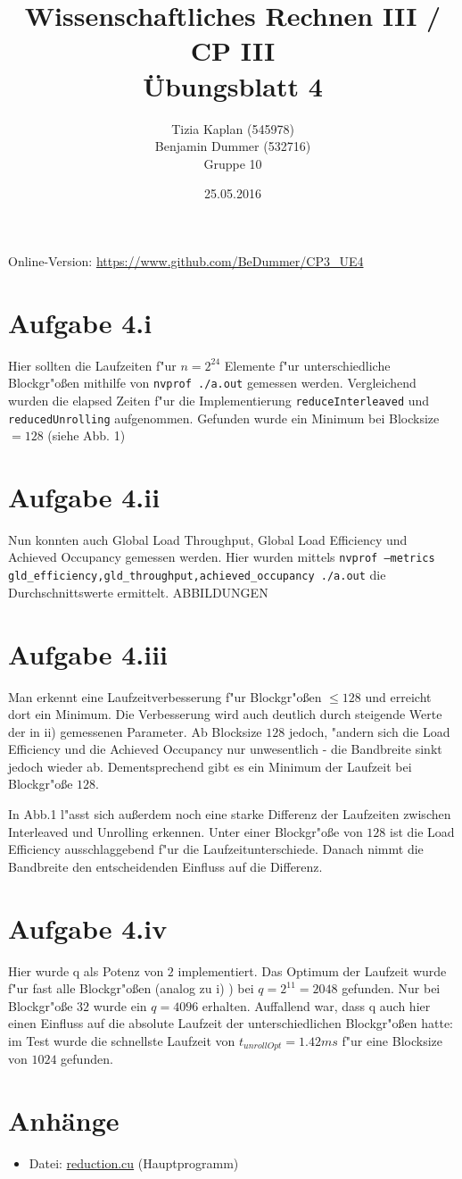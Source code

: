 \documentclass[%
	paper=A4,	%
	pagesize,	%
	DIV=calc,	%
	smallheadings,	%
	ngerman		%
]{scrartcl}
\title{{\bf Wissenschaftliches Rechnen III / CP III}\\Übungsblatt 4}
\author{Tizia Kaplan (545978)\\Benjamin Dummer (532716)\\ Gruppe 10}
\date{25.05.2016}
\begin{document}
\maketitle
Online-Version: \href{https://www.github.com/BeDummer/CP3_UE4}{\url{https://www.github.com/BeDummer/CP3_UE4}}

\section*{Aufgabe 4.i}
Hier sollten die Laufzeiten f"ur $n=2^24$ Elemente f"ur unterschiedliche Blockgr"o\ss en mithilfe von \texttt{nvprof ./a.out} gemessen werden. Vergleichend wurden die elapsed Zeiten f"ur die Implementierung \texttt{reduceInterleaved} und \texttt{reducedUnrolling} aufgenommen. Gefunden wurde ein Minimum bei Blocksize $=128$ (siehe Abb. 1) 

\section*{Aufgabe 4.ii}
Nun konnten auch Global Load Throughput, Global Load Efficiency und Achieved Occupancy gemessen werden. Hier wurden mittels \texttt{nvprof --metrics gld_efficiency,gld_throughput,achieved_occupancy ./a.out} die Durchschnittswerte ermittelt.
ABBILDUNGEN

\section*{Aufgabe 4.iii}
Man erkennt eine Laufzeitverbesserung f"ur Blockgr"o\ss en $\leq 128$ und erreicht dort ein Minimum. Die Verbesserung wird auch deutlich durch steigende Werte der in ii) gemessenen Parameter. Ab Blocksize $128$ jedoch, "andern sich die Load Efficiency und die Achieved Occupancy nur unwesentlich - die Bandbreite sinkt jedoch wieder ab. Dementsprechend gibt es ein Minimum der Laufzeit bei Blockgr"o\ss e $128$.

In Abb.1 l"asst sich au\ss erdem noch eine starke Differenz der Laufzeiten zwischen Interleaved und Unrolling erkennen. Unter einer Blockgr"o\ss e von $128$ ist die Load Efficiency ausschlaggebend f"ur die Laufzeitunterschiede. Danach nimmt die Bandbreite den entscheidenden Einfluss auf die Differenz.

\section*{Aufgabe 4.iv}
Hier wurde q als Potenz von $2$ implementiert. Das Optimum der Laufzeit wurde f"ur fast alle Blockgr"o\ss en (analog zu i) ) bei $q=2^11=2048$ gefunden. Nur bei Blockgr"o\ss e $32$ wurde ein $q=4096$ erhalten. Auffallend war, dass q auch hier einen Einfluss auf die absolute Laufzeit der unterschiedlichen Blockgr"o\ss en hatte: im Test wurde die schnellste Laufzeit von $t_{unrollOpt}=1.42 ms$ f"ur eine Blocksize von $1024$ gefunden.



\section*{Anhänge}
\begin{itemize}
	\item Datei: \url{reduction.cu} (Hauptprogramm)
\end{itemize}
\end{document}
